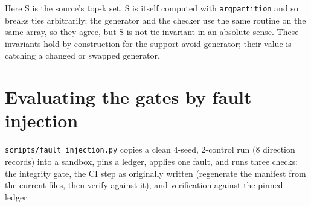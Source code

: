 \documentclass[
  10pt,
]{article}
\begin{document}
Here S is the source's top-k set. S is itself computed with
\texttt{argpartition} and so breaks ties arbitrarily; the generator and
the checker use the same routine on the same array, so they agree, but S
is not tie-invariant in an absolute sense. These invariants hold by
construction for the support-avoid generator; their value is catching a
changed or swapped generator.

\section{Evaluating the gates by fault
injection}\label{evaluating-the-gates-by-fault-injection}

\texttt{scripts/fault\_injection.py} copies a clean 4-seed, 2-control
run (8 direction records) into a sandbox, pins a ledger, applies one
fault, and runs three checks: the integrity gate, the CI step as
originally written (regenerate the manifest from the current files, then
verify against it), and verification against the pinned ledger.
\end{document}
